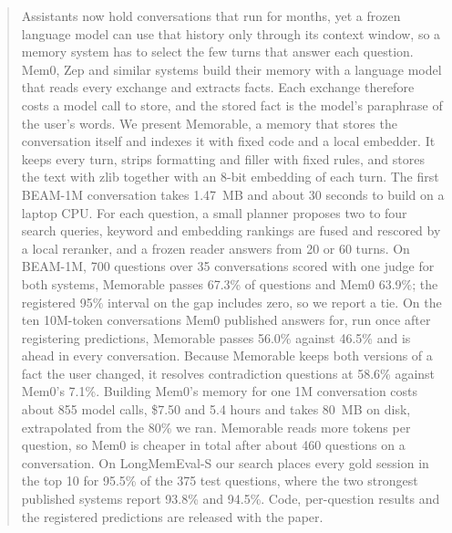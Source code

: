 \begin{abstract}
Assistants now hold conversations that run for months, yet a frozen language model can use that history only through its context window, so a memory system has to select the few turns that answer each question. Mem0, Zep and similar systems build their memory with a language model that reads every exchange and extracts facts. Each exchange therefore costs a model call to store, and the stored fact is the model's paraphrase of the user's words. We present Memorable, a memory that stores the conversation itself and indexes it with fixed code and a local embedder. It keeps every turn, strips formatting and filler with fixed rules, and stores the text with zlib together with an 8-bit embedding of each turn. The first BEAM-1M conversation takes 1.47~MB and about 30 seconds to build on a laptop CPU. For each question, a small planner proposes two to four search queries, keyword and embedding rankings are fused and rescored by a local reranker, and a frozen reader answers from 20 or 60 turns. On BEAM-1M, 700 questions over 35 conversations scored with one judge for both systems, Memorable passes 67.3\% of questions and Mem0 63.9\%; the registered 95\% interval on the gap includes zero, so we report a tie. On the ten 10M-token conversations Mem0 published answers for, run once after registering predictions, Memorable passes 56.0\% against 46.5\% and is ahead in every conversation. Because Memorable keeps both versions of a fact the user changed, it resolves contradiction questions at 58.6\% against Mem0's 7.1\%. Building Mem0's memory for one 1M conversation costs about 855 model calls, \$7.50 and 5.4 hours and takes 80~MB on disk, extrapolated from the 80\% we ran. Memorable reads more tokens per question, so Mem0 is cheaper in total after about 460 questions on a conversation. On LongMemEval-S our search places every gold session in the top 10 for 95.5\% of the 375 test questions, where the two strongest published systems report 93.8\% and 94.5\%. Code, per-question results and the registered predictions are released with the paper.
\end{abstract}
